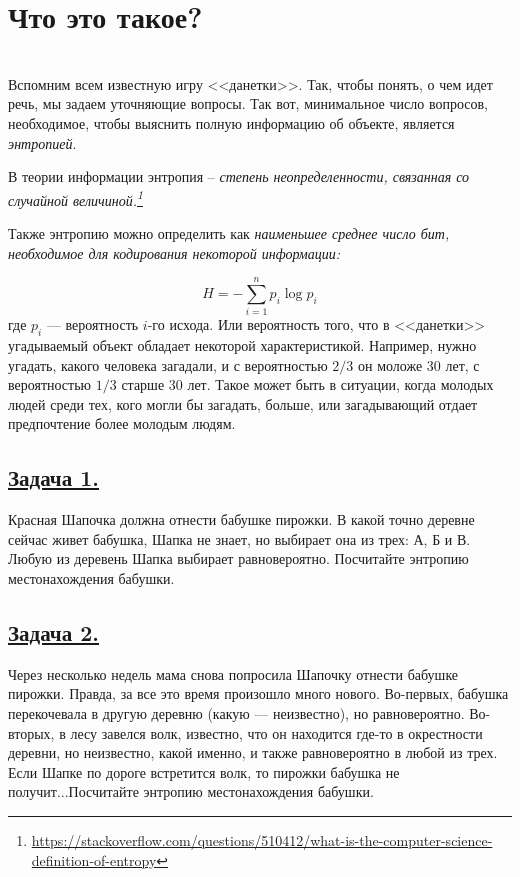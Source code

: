 \section*{Что это такое?}~\
\\ 

Вспомним всем известную игру <<данетки>>. Так, чтобы понять, о чем идет речь, мы задаем уточняющие вопросы. Так вот, минимальное число вопросов, необходимое, чтобы выяснить полную информацию об объекте, является \textit{энтропией}.

В теории информации энтропия -- \textit{степень неопределенности, связанная со случайной величиной.\footnote{\url{https://stackoverflow.com/questions/510412/what-is-the-computer-science-definition-of-entropy}}}

Также энтропию можно определить как \textit{наименьшее среднее число бит, необходимое для кодирования некоторой информации:}

\[H=-\sum\limits_{i=1}^n p_i\log p_i \]
где $p_i$ --- вероятность $i$-го исхода. Или вероятность того, что в <<данетки>> угадываемый объект обладает некоторой характеристикой. Например, нужно угадать, какого человека загадали, и с вероятностью $2/3$ он моложе 30 лет, с вероятностью $1/3$ старше 30 лет. Такое может быть в ситуации, когда молодых людей среди тех, кого могли бы загадать, больше, или загадывающий отдает предпочтение более молодым людям. 

\subsection*{\hyperref[sec:sol_problem1]{Задача 1.}}\label{sec:problem1} 
Красная Шапочка должна отнести бабушке пирожки. В какой точно деревне сейчас живет бабушка, Шапка не знает, но выбирает она из трех: А, Б и В. Любую из деревень Шапка выбирает равновероятно. Посчитайте энтропию местонахождения бабушки.

\subsection*{\hyperref[sec:sol_problem2]{Задача 2.}}\label{sec:problem2}  Через несколько недель мама снова попросила Шапочку отнести бабушке пирожки. Правда, за все это время произошло много нового. Во-первых, бабушка перекочевала в другую деревню (какую --- неизвестно), но равновероятно. Во-вторых, в лесу завелся волк, известно, что он находится где-то в окрестности деревни, но неизвестно, какой именно, и также равновероятно в любой из трех. Если Шапке по дороге встретится волк, то пирожки бабушка не получит...Посчитайте энтропию местонахождения бабушки.

